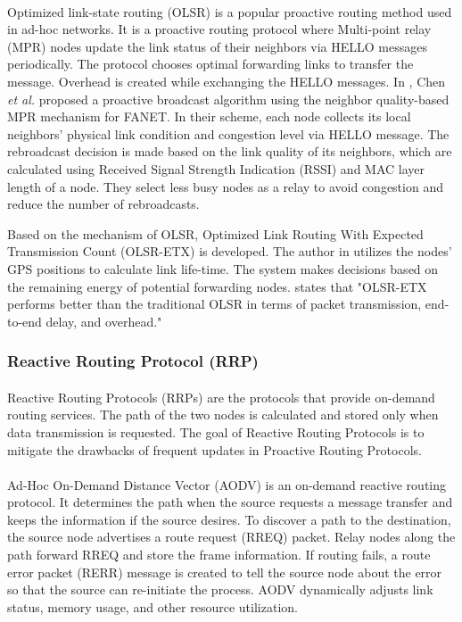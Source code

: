 \documentclass[a4paper,12pt]{report}
\begin{document}
\paragraph{}
Optimized link-state routing (OLSR) is a popular proactive routing method used in ad-hoc networks\cite{8772093}. It is a proactive routing protocol where Multi-point relay (MPR) nodes update the link status of their neighbors via HELLO messages periodically. The protocol chooses optimal forwarding links to transfer the message. Overhead is created while exchanging the HELLO messages. In \cite{5}, Chen {\it et al.} proposed a proactive broadcast algorithm using the neighbor quality-based MPR mechanism for FANET. In their scheme, each node collects its local neighbors' physical link condition and congestion level via HELLO message. The rebroadcast decision is made based on the link quality of its neighbors, which are calculated using Received Signal Strength Indication (RSSI) and MAC layer length of a node. They select less busy nodes as a relay to avoid congestion and reduce the number of rebroadcasts.

Based on the mechanism of OLSR, Optimized Link Routing With Expected Transmission Count (OLSR-ETX) is developed\cite{Xie2018AnEO}. The author in \cite{Xie2018AnEO} utilizes the nodes' GPS positions to calculate link life-time. The system makes decisions based on the remaining energy of potential forwarding nodes. \cite{8772093} states that "OLSR-ETX performs better than the traditional OLSR in terms of packet transmission, end-to-end delay, and overhead."

\subsubsection{Reactive Routing Protocol (RRP)}
\paragraph{}
Reactive Routing Protocols (RRPs) are the protocols that provide on-demand routing services. The path of the two nodes is calculated and stored only when data transmission is requested. The goal of Reactive Routing Protocols is to mitigate the drawbacks of frequent updates in Proactive Routing Protocols.

\paragraph{}
Ad-Hoc On-Demand Distance Vector (AODV) is an on-demand reactive routing protocol. It determines the path when the source requests a message transfer and keeps the information if the source desires. To discover a path to the destination, the source node advertises a route request (RREQ) packet. Relay nodes along the path forward RREQ and store the frame information\cite{maurya2012overview}. If routing fails, a route error packet (RERR) message is created to tell the source node about the error so that the source can re-initiate the process. AODV dynamically adjusts link status, memory usage, and other resource utilization\cite{maurya2012overview}.
\end{document}
